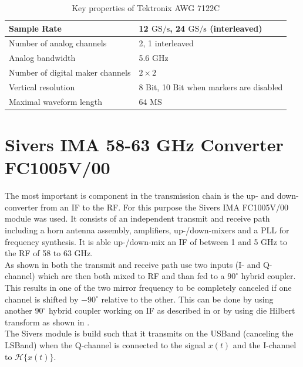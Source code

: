 \begin{table}[h]
  \centering
  \begin{tabular}{|l|l|}
    \hline
    Sample Rate & 12 $\text{GS}/\text{s}$, 24 $\text{GS}/\text{s}$ (interleaved) \\ \hline
    Number of analog channels & 2, 1 interleaved \\ \hline
    Analog bandwidth & 5.6 GHz \\ \hline
    Number of digital maker channels & $2 \times 2$ \\ \hline
    Vertical resolution & 8 Bit, 10 Bit when markers are disabled \\ \hline
    Maximal waveform length & 64 MS  \\ \hline
  \end{tabular}
  \caption{Key properties of Tektronix AWG 7122C}
  \label{tab:awg}
\end{table}

\section{Sivers IMA 58-63 GHz Converter FC1005V/00}
\label{sec:comp_sivers}
The most important is component in the transmission chain is the
up- and down-converter from an \acrfull{IF} to the \acrfull{RF}.
For this purpose the Sivers IMA FC1005V/00 module was used.
It consists of an independent transmit and receive path including
a horn antenna assembly, amplifiers, up-/down-mixers and a \gls{PLL}
for frequency synthesis. It is able up-/down-mix an \gls{IF}
of between 1 and 5 GHz to the \gls{RF} of 58 to 63 GHz. \\

As shown in  both the transmit and receive path
use two inputs (I- and Q-channel) which are then both mixed to
\gls{RF} and than fed to a $90^\circ$ hybrid coupler. \\
This results in one of the two mirror frequency to be completely canceled
if one channel is shifted by $-90^\circ$ relative to the other.
This can be done by using another $90^\circ$ hybrid coupler working on
\gls{IF} as described in  or by using die Hilbert
transform as shown in . \\
The Sivers module is build such that it transmits on the \gls{USBand}
(canceling the \gls{LSBand}) when the Q-channel is connected to the signal
$x(t)$ and the I-channel to $\mathcal{H}\{x(t)\}$. \\

